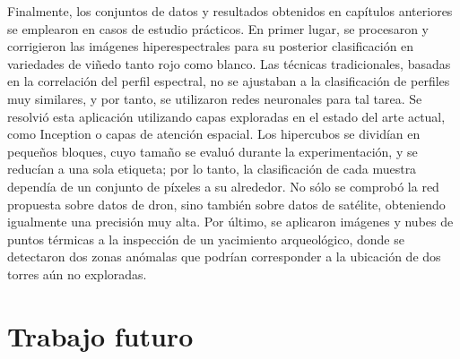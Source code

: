 Finalmente, los conjuntos de datos y resultados obtenidos en capítulos anteriores se emplearon en casos de estudio prácticos. En primer lugar, se procesaron y corrigieron las imágenes hiperespectrales para su posterior clasificación en variedades de viñedo tanto rojo como blanco. Las técnicas tradicionales, basadas en la correlación del perfil espectral, no se ajustaban a la clasificación de perfiles muy similares, y por tanto, se utilizaron redes neuronales para tal tarea. Se resolvió esta aplicación utilizando capas exploradas en el estado del arte actual, como Inception o capas de atención espacial. Los hipercubos se dividían en pequeños bloques, cuyo tamaño se evaluó durante la experimentación, y se reducían a una sola etiqueta; por lo tanto, la clasificación de cada muestra dependía de un conjunto de píxeles a su alrededor. No sólo se comprobó la red propuesta sobre datos de dron, sino también sobre datos de satélite, obteniendo igualmente una precisión muy alta. Por último, se aplicaron imágenes y nubes de puntos térmicas a la inspección de un yacimiento arqueológico, donde se detectaron dos zonas anómalas que podrían corresponder a la ubicación de dos torres aún no exploradas. 

\section{Trabajo futuro}


